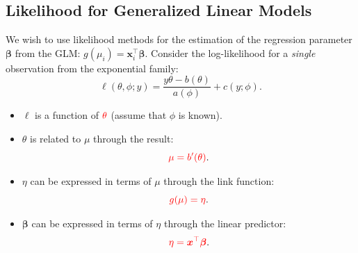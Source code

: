 \documentclass{article}\usepackage[]{graphicx}\usepackage[svgnames]{xcolor}
\providecommand{\Vector}[1]{\bm{#1}}%
\begin{document}
\subsection*{Likelihood for Generalized Linear Models}
We wish to use likelihood methods for the estimation of the regression parameter $ \Vector{\beta} $ from the GLM: $ g(\mu_i)=\Vector{x}_i^\top \Vector{\beta} $.
Consider the log-likelihood for a \emph{single} observation from the exponential family:
\[ \ell(\theta,\phi;y)=\frac{y\theta-b(\theta)}{a(\phi)}+c(y;\phi). \]
\begin{itemize}
    \item $ \ell $ is a function of $ \textcolor{Red}{\theta} $ (assume that $ \phi $ is known).
    \item $ \theta $ is related to $ \mu $ through the result:
          \[ \textcolor{Red}{\mu=b^{\prime}(\theta)}. \]
    \item $ \eta $ can be expressed in terms of $ \mu $ through the link function:
          \[ \textcolor{Red}{g(\mu)=\eta}. \]
    \item $ \Vector{\beta} $ can be expressed in terms of $ \eta $ through the linear predictor:
          \[ \textcolor{Red}{\eta=\Vector{x}^\top \Vector{\beta}}. \]
\end{itemize}
\end{document}
